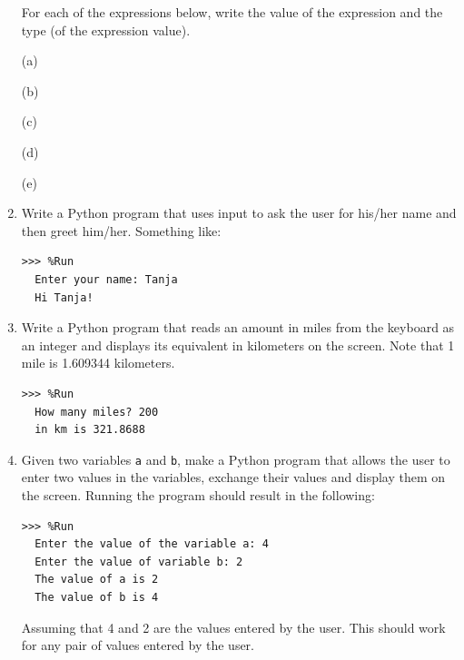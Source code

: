 \begin{enumerate}
For each of the expressions below, write the value of the expression and the type (of the expression value).

(a)  

(b)   

(c)   

(d)   

(e)   



\item Write a Python program that uses input to ask the user for his/her name and then greet him/her. Something like:


\begin{Verbatim}[frame=single, label={\em examples and possible execution tests}]
>>> %Run
  Enter your name: Tanja
  Hi Tanja!
\end{Verbatim}



\item Write a Python program that reads an amount in miles from the keyboard as an integer and displays its equivalent in kilometers on the screen. Note that 1 mile is 1.609344 kilometers.

\begin{Verbatim}[frame=single, label={\em examples and possible execution tests}]
>>> %Run
  How many miles? 200
  in km is 321.8688
\end{Verbatim}



\item Given two variables \verb+a+ and \verb+b+, make a Python program that allows the user to enter two values in the variables, exchange their values and display them on the screen. Running the program should result in the following:
\begin{Verbatim}[frame=single, label={\em example of execution}]
>>> %Run 
  Enter the value of the variable a: 4
  Enter the value of variable b: 2
  The value of a is 2
  The value of b is 4
\end{Verbatim}
Assuming that 4 and 2 are the values entered by the user.
This should work for any pair of values entered by the user.


\end{enumerate}
